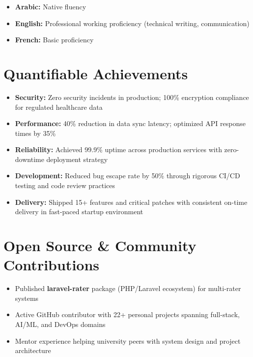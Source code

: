 \documentclass[11pt,a4paper]{article}
\begin{document}
\begin{itemize}
    \item \textbf{Arabic:} Native fluency
    \item \textbf{English:} Professional working proficiency (technical writing, communication)
    \item \textbf{French:} Basic proficiency
\end{itemize}

\vspace{6pt}

\section{Quantifiable Achievements}

\begin{itemize}
    \item \textbf{Security:} Zero security incidents in production; 100\% encryption compliance for regulated healthcare data
    \item \textbf{Performance:} 40\% reduction in data sync latency; optimized API response times by 35\%
    \item \textbf{Reliability:} Achieved 99.9\% uptime across production services with zero-downtime deployment strategy
    \item \textbf{Development:} Reduced bug escape rate by 50\% through rigorous CI/CD testing and code review practices
    \item \textbf{Delivery:} Shipped 15+ features and critical patches with consistent on-time delivery in fast-paced startup environment
\end{itemize}

\vspace{6pt}

\section{Open Source \& Community Contributions}

\begin{itemize}
    \item Published \textbf{laravel-rater} package (PHP/Laravel ecosystem) for multi-rater systems
    \item Active GitHub contributor with 22+ personal projects spanning full-stack, AI/ML, and DevOps domains
    \item Mentor experience helping university peers with system design and project architecture
\end{itemize}
\end{document}
